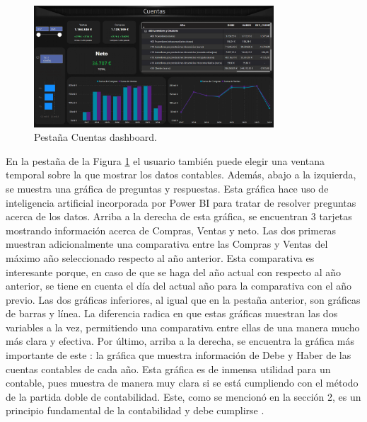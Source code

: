 \begin{figure}[H]
	\centering
	\includegraphics[width= 0.8\textwidth]{imgs/cuentas_dashboard}
	\caption{Pestaña Cuentas dashboard.}
	\label{cuentas}
\end{figure}

En la pestaña de la Figura \ref{cuentas} el usuario también puede elegir una ventana temporal sobre la que mostrar los datos contables. Además, abajo a la izquierda, se muestra una gráfica de preguntas y respuestas. Esta gráfica hace uso de inteligencia artificial incorporada por Power BI para tratar de resolver preguntas acerca de los datos. Arriba a la derecha de esta gráfica, se encuentran 3 tarjetas mostrando información acerca de Compras, Ventas y neto. Las dos primeras muestran adicionalmente una comparativa entre las Compras y Ventas del máximo año seleccionado respecto al año anterior. Esta comparativa es interesante porque, en caso de que se haga del año actual con respecto al año anterior, se tiene en cuenta el día del actual año para la comparativa con el año previo\fnm. Las dos gráficas inferiores, al igual que en la  pestaña anterior, son gráficas de barras y línea. La diferencia radica en que estas gráficas muestran las dos variables a la vez, permitiendo una comparativa entre ellas de una manera mucho más clara y efectiva. Por último, arriba a la derecha, se encuentra la gráfica más importante de este : la gráfica que muestra información de Debe y Haber de las cuentas contables de cada año. Esta gráfica es de inmensa utilidad para un contable, pues muestra de manera muy clara si se está cumpliendo con el método de la partida doble de contabilidad. Este, como se mencionó en la sección 2, es un principio fundamental de la contabilidad y debe cumplirse .




